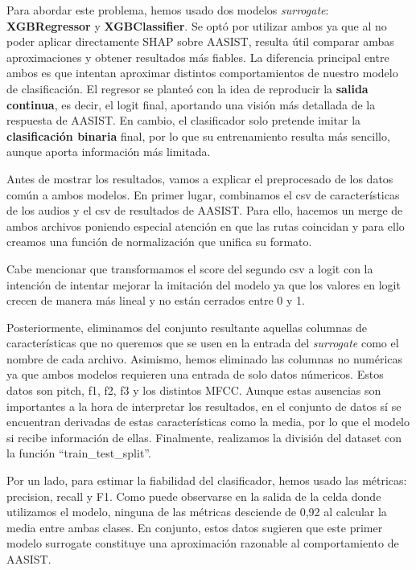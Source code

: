 Para abordar este problema, hemos usado dos modelos \textit{surrogate}: \textbf{XGBRegressor} y \textbf{XGBClassifier}. Se optó por utilizar ambos ya que al no poder aplicar directamente SHAP sobre AASIST, resulta útil comparar ambas aproximaciones y obtener resultados más fiables. La diferencia principal entre ambos es que intentan aproximar distintos comportamientos de nuestro modelo de clasificación. El regresor se planteó con la idea de reproducir la \textbf{salida continua}, es decir, el logit final, aportando una visión más detallada de la respuesta de AASIST. En cambio, el clasificador solo pretende imitar la \textbf{clasificación binaria} final, por lo que su entrenamiento resulta más sencillo, aunque aporta información más limitada.

Antes de mostrar los resultados, vamos a explicar el preprocesado de los datos común a ambos modelos.
En primer lugar, combinamos el csv de características de los audios y el csv de resultados de AASIST. Para ello, hacemos un merge de ambos archivos poniendo especial atención en que las rutas coincidan y para ello creamos una función de normalización que unifica su formato.

Cabe mencionar que transformamos el score del segundo csv a logit con la intención de intentar mejorar la imitación del modelo ya que los valores en logit crecen de manera más lineal y no están cerrados entre 0 y 1.

Posteriormente, eliminamos del conjunto resultante aquellas columnas de características que no queremos que se usen en la entrada del \textit{surrogate} como el nombre de cada archivo. Asimismo, hemos eliminado las columnas no numéricas ya que ambos modelos requieren una entrada de solo datos númericos. Estos datos son pitch, f1, f2, f3 y los distintos MFCC. Aunque estas ausencias son importantes a la hora de interpretar los resultados, en el conjunto de datos sí se encuentran derivadas de estas características como la media, por lo que el modelo si recibe información de ellas. Finalmente, realizamos la división del dataset con la función ``train\_test\_split''.

Por un lado, para estimar la fiabilidad del clasificador, hemos usado las métricas: precision, recall y F1. Como puede observarse en la salida de la celda donde utilizamos el modelo, ninguna de las métricas desciende de 0,92 al calcular la media entre ambas clases. En conjunto, estos datos sugieren que este primer modelo surrogate constituye una aproximación razonable al comportamiento de AASIST.

